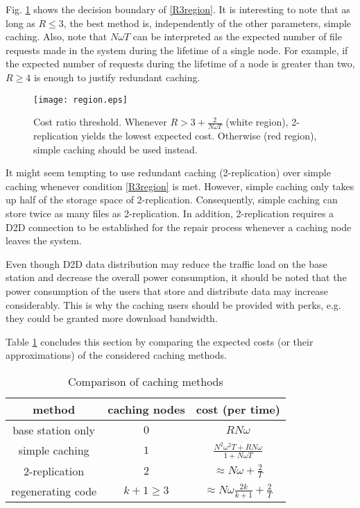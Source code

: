 \documentclass[10pt,conference]{IEEEtran}
\begin{document}
Fig. \ref{region} shows the decision boundary of \eqref{R3region}.
It is interesting to note that as long as $R\leq 3$, the best method
is, independently of the other parameters, simple caching. Also, note
that $N\omega T$ can be interpreted as the expected number of file
requests made in the system during the lifetime of a single node. For example, if the expected number of requests during the lifetime of a
node is greater than two, $R\geq 4$ is enough to justify redundant
caching.

\begin{figure}[tbhp]
\centering \texttt{[image: region.eps]}
\caption{Cost ratio threshold. Whenever $R>3+\frac{2}{N\omega T}$ (white region), 2-replication yields the lowest expected cost. Otherwise (red region), simple caching should be used instead.}
\label{region}
\end{figure}
It might seem tempting to use redundant caching (2-replication) over
simple caching whenever condition \eqref{R3region} is met. However,
simple caching only takes up half of the storage space of
2-replication. Consequently, simple caching can store twice as many
files as 2-replication. In addition, 2-replication requires a D2D
connection to be established for the repair process whenever a caching
node leaves the system.

Even though D2D data distribution may reduce the traffic load on the base station and decrease the overall power consumption, it should be noted that the power consumption of the users that store and distribute data may increase considerably. This is why the caching users should be provided with perks, e.g. they could be granted more download bandwidth.

Table \ref{tab} concludes this section by comparing the expected costs (or their approximations) of the considered caching methods.
\begin{table}[htb]
\begin{center}
\caption{Comparison of caching methods}
\def\arraystretch{2}
\begin{tabular}{ | c | c | c |}
\hline
\textbf{method} & \textbf{caching nodes} & \textbf{cost (per time)}  \\ \hline
base station only & $0$ & $RN\omega$ \\ \hline
simple caching & $1$ & $\frac{N^2\omega^2 T + RN\omega}{1 + N\omega T}$ \\ \hline
2-replication & $2$ & $\approx N\omega + \frac{2}{T}$ \\ \hline
regenerating code & $k+1\geq 3$ & $\approx N\omega \frac{2k}{k+1} + \frac{2}{T}$ \\ \hline
\end{tabular}
\label{tab}
\end{center}
\end{table}
\end{document}
